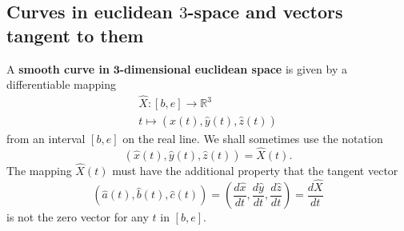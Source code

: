 \documentclass{ximera}
\begin{document}
\subsection*{Curves in euclidean $3$-space and vectors tangent to them}

\begin{definition}
A \textbf{smooth curve in }$\mathbf{3}$\textbf{-dimensional euclidean space}
is given by a differentiable mapping%
\begin{gather*}
\hat{X}:\left[  b,e\right]  \rightarrow\mathbb{R}^{3}\\
t\mapsto\left(  \hat{x}\left(  t\right)  ,\hat{y}\left(  t\right)  ,\hat
{z}\left(  t\right)  \right)
\end{gather*}
\hspace{5mm} \hspace{5mm} \hspace{5mm} \hspace{5mm} from an interval $\left[
b,e\right]  $ on the real line. We shall sometimes use the notation%
\[
\left(  \hat{x}\left(  t\right)  ,\hat{y}\left(  t\right)  ,\hat{z}\left(
t\right)  \right)  =\hat{X}\left(  t\right)  .
\]
The mapping $\hat{X}\left(  t\right)  $ must have the additional property that
the tangent vector
\[
\left(  \hat{a}\left(  t\right)  ,\hat{b}\left(  t\right)  ,\hat{c}\left(
t\right)  \right)  =\left(  \frac{d\hat{x}}{dt},\frac{d\hat{y}}{dt}%
,\frac{d\hat{z}}{dt}\right)  =\frac{d\hat{X}}{dt}%
\]
\hspace{5mm} \hspace{5mm} is not the zero vector for any $t$ in $\left[
b,e\right]  $.
\end{definition}
\end{document}
